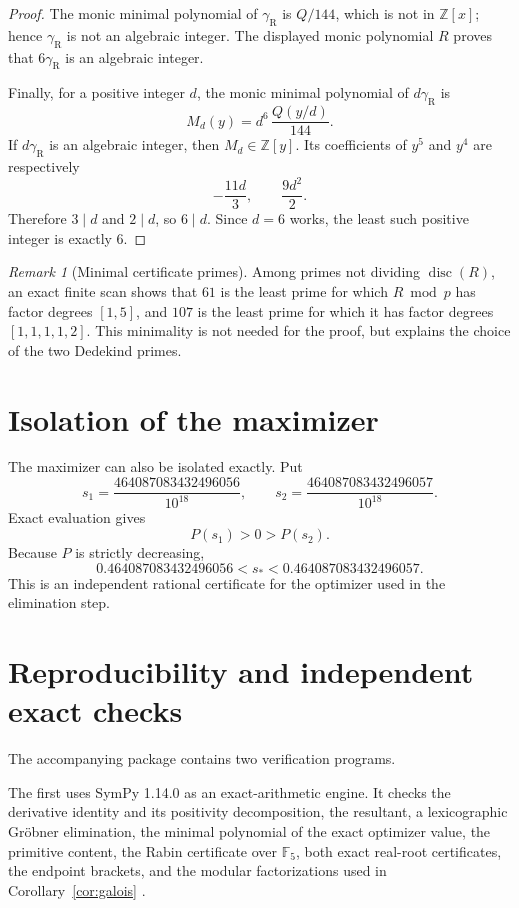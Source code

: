 \documentclass[11pt]{article}
\theoremstyle{remark}
\newtheorem{remark}[theorem]{Remark}
\newcommand{\gR}{\gamma_{\mathrm R}}
\begin{document}
\begin{proof}
The monic minimal polynomial of \(\gR\) is \(Q/144\), which is not in \(\mathbb Z[x]\); hence \(\gR\) is not an algebraic integer. The displayed monic polynomial \(R\) proves that \(6\gR\) is an algebraic integer.

Finally, for a positive integer \(d\), the monic minimal polynomial of \(d\gR\) is
\[
M_d(y)=d^6\,\frac{Q(y/d)}{144}.
\]
If \(d\gR\) is an algebraic integer, then \(M_d\in\mathbb Z[y]\). Its coefficients of \(y^5\) and \(y^4\) are respectively
\[
-\frac{11d}{3},\qquad \frac{9d^2}{2}.
\]
Therefore \(3\mid d\) and \(2\mid d\), so \(6\mid d\). Since \(d=6\) works, the least such positive integer is exactly \(6\).
\end{proof}

\begin{remark}[Minimal certificate primes]
Among primes not dividing \(\operatorname{disc}(R)\), an exact finite scan shows that \(61\) is the least prime for which \(R\bmod p\) has factor degrees \([1,5]\), and \(107\) is the least prime for which it has factor degrees \([1,1,1,1,2]\). This minimality is not needed for the proof, but explains the choice of the two Dedekind primes.
\end{remark}

\section{Isolation of the maximizer}
The maximizer can also be isolated exactly. Put
\[
s_1=\frac{464087083432496056}{10^{18}},
\qquad
s_2=\frac{464087083432496057}{10^{18}}.
\]
Exact evaluation gives
\[
P(s_1)>0>P(s_2).
\]
Because \(P\) is strictly decreasing,
\[
0.464087083432496056<s_*<0.464087083432496057.
\]
This is an independent rational certificate for the optimizer used in the elimination step.

\section{Reproducibility and independent exact checks}
The accompanying package contains two verification programs.

The first uses SymPy 1.14.0 as an exact-arithmetic engine. It checks the derivative identity and its positivity decomposition, the resultant, a lexicographic Gr\"obner elimination, the minimal polynomial of the exact optimizer value, the primitive content, the Rabin certificate over \(\mathbb F_5\), both exact real-root certificates, the endpoint brackets, and the modular factorizations used in Corollary~\ref{cor:galois} \cite{SymPy2017}.
\end{document}
